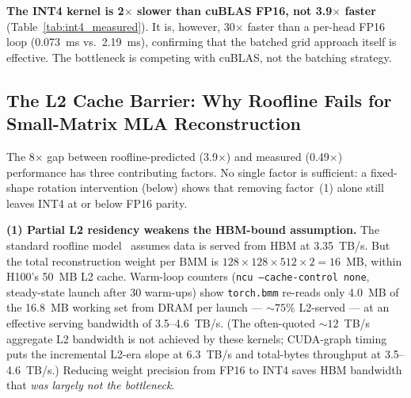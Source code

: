\documentclass[10pt,twocolumn]{article}
\begin{document}
\textbf{The INT4 kernel is 2$\times$ slower than cuBLAS FP16, not 3.9$\times$ faster} (Table~\ref{tab:int4_measured}).  It is, however, 30$\times$ faster than a per-head FP16 loop (0.073~ms vs.\ 2.19~ms), confirming that the batched grid approach itself is effective.  The bottleneck is competing with cuBLAS, not the batching strategy.

\subsection{The L2 Cache Barrier: Why Roofline Fails for Small-Matrix MLA Reconstruction}
\label{sec:l2barrier}

The 8$\times$ gap between roofline-predicted (3.9$\times$) and measured (0.49$\times$) performance has three contributing factors.  No single factor is sufficient: a fixed-shape rotation intervention (below) shows that removing factor~(1) alone still leaves INT4 at or below FP16 parity.

\textbf{(1) Partial L2 residency weakens the HBM-bound assumption.}  The standard roofline model~\cite{roofline} assumes data is served from HBM at 3.35~TB/s.  But the total reconstruction weight per BMM is $128 \times 128 \times 512 \times 2 = 16$~MB, within H100's 50~MB L2 cache.  Warm-loop counters (\texttt{ncu --cache-control none}, steady-state launch after 30 warm-ups) show \texttt{torch.bmm} re-reads only 4.0~MB of the 16.8~MB working set from DRAM per launch --- ${\sim}75\%$ L2-served --- at an effective serving bandwidth of 3.5--4.6~TB/s.  (The often-quoted ${\sim}12$~TB/s aggregate L2 bandwidth is not achieved by these kernels; CUDA-graph timing puts the incremental L2-era slope at 6.3~TB/s and total-bytes throughput at 3.5--4.6~TB/s.)  Reducing weight precision from FP16 to INT4 saves HBM bandwidth that \emph{was largely not the bottleneck}.
\end{document}
